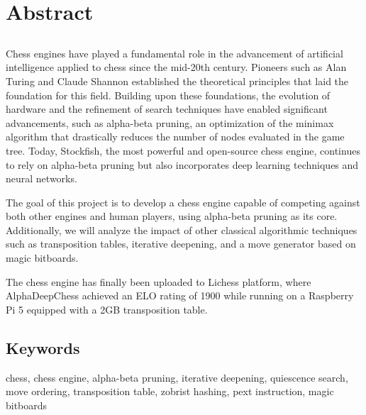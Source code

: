 \chapter*{Abstract}

\section*{\tituloPortadaEngVal}

Chess engines have played a fundamental role in the advancement of artificial intelligence applied to chess since the mid-20th century. Pioneers such as Alan Turing and Claude Shannon established the theoretical principles that laid the foundation for this field. Building upon these foundations, the evolution of hardware and the refinement of search techniques have enabled significant advancements, such as alpha-beta pruning, an optimization of the minimax algorithm that drastically reduces the number of nodes evaluated in the game tree. Today, Stockfish, the most powerful and open-source chess engine, continues to rely on alpha-beta pruning but also incorporates deep learning techniques and neural networks.

\vspace{1em}

The goal of this project is to develop a chess engine capable of competing against both other engines and human players, using alpha-beta pruning as its core. Additionally, we will analyze the impact of other classical algorithmic techniques such as transposition tables, iterative deepening, and a move generator based on magic bitboards.

\vspace{1em}

The chess engine has finally been uploaded to Lichess platform, where AlphaDeepChess achieved an ELO rating of 1900 while running on a Raspberry Pi 5 equipped with a 2GB transposition table.

\section*{Keywords}

\noindent chess, chess engine, alpha-beta pruning, iterative deepening, quiescence search, move ordering, transposition table, zobrist hashing, pext instruction, magic bitboards
